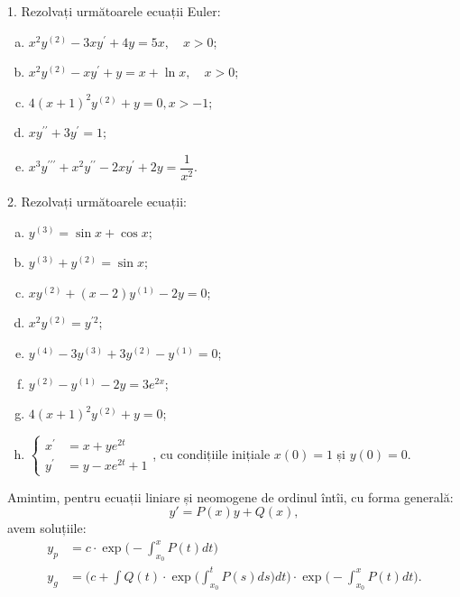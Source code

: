 1. Rezolvați următoarele ecuații Euler:
\begin{enumerate}[(a)]
  \item $ x^2 y^{(2)} - 3xy^{\prime} + 4y = 5x, \quad x > 0 $;
  \item $ x^2 y^{(2)} - xy^{\prime} + y = x + \ln x, \quad x > 0 $;
  \item $ 4(x + 1)^2 y^{(2)} + y = 0, x > -1 $;
  \item $ xy^{\prime\prime} + 3y^{\prime} = 1 $;
  \item $ x^3 y^{\prime\prime\prime} + x^2y^{\prime\prime} - 2xy^{\prime} + 2y = \dfrac{1}{x^2} $.
\end{enumerate}


\vspace{1cm}

2. Rezolvați următoarele ecuații:
\begin{enumerate}[(a)]
  \item $ y^{(3)} = \sin x + \cos x $;
  \item $ y^{(3)} + y^{(2)} = \sin x $;
  \item $ xy^{(2)} + (x - 2)y^{(1)} - 2y = 0 $;
  \item $ x^2 y^{(2)} = y^{\prime 2} $;
  \item $ y^{(4)} - 3y^{(3)} + 3y^{(2)} - y^{(1)} = 0 $;
  \item $ y^{(2)} - y^{(1)} - 2y = 3e^{2x} $;
  \item $ 4(x + 1)^2 y^{(2)} + y = 0 $;
  \item $ \begin{cases}
      x^\prime &= x + ye^{2t} \\
      y^\prime &= y - xe^{2t} + 1
    \end{cases} $,
    cu condițiile inițiale $ x(0) = 1 $ și $ y(0) = 0 $.
\end{enumerate}

Amintim, pentru ecuații liniare și neomogene de ordinul întîi, cu forma generală:
\[
  y' = P(x) y + Q(x),
\]
avem soluțiile:
\begin{align*}
  y_p &= c \cdot \exp\Big( - \int_{x_0}^x P(t) dt \Big) \\
  y_g &= \Big( c + \int Q(t) \cdot \exp \Big( \int_{x_0}^t P(s) ds \Big) dt \Big) \cdot \exp \Big(- \int_{x_0}^x P(t) dt \Big).
\end{align*}


